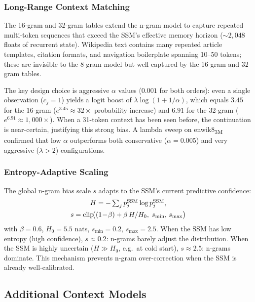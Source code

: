 \documentclass[10pt,twocolumn]{article}
\begin{document}
\subsubsection{Long-Range Context Matching}
\label{sec:longrange}

The 16-gram and 32-gram tables extend the n-gram model to capture
repeated multi-token sequences that exceed the SSM's effective memory
horizon (${\sim}2{,}048$ floats of recurrent state).  Wikipedia text
contains many repeated article templates, citation formats, and
navigation boilerplate spanning 10--50 tokens; these are invisible to
the 8-gram model but well-captured by the 16-gram and 32-gram
tables.

The key design choice is aggressive $\alpha$ values ($0.001$ for both
orders): even a single observation ($c_j=1$) yields a logit boost of
$\lambda\log(1+1/\alpha)$, which equals $3.45$ for the 16-gram
($e^{3.45}\approx 32\times$ probability increase) and $6.91$ for the
32-gram ($e^{6.91}\approx 1{,}000\times$).  When a 31-token context
has been seen before, the continuation is near-certain, justifying
this strong bias.  A lambda sweep on enwik8\textsubscript{3M}
confirmed that low $\alpha$ outperforms both conservative
($\alpha=0.005$) and very aggressive ($\lambda>2$) configurations.

\subsubsection{Entropy-Adaptive Scaling}
\label{sec:adaptive}

The global n-gram bias scale $s$ adapts to the SSM's current
predictive confidence:
\begin{gather}
  H = -\textstyle\sum_j p^\mathrm{SSM}_j \log p^\mathrm{SSM}_j,\notag\\
  s = \mathrm{clip}\!\bigl((1\!-\!\beta) + \beta\,H/H_0,\;
    s_\text{min},\, s_\text{max}\bigr)
  \label{eq:adaptscale}
\end{gather}
with $\beta=0.6$, $H_0=5.5$ nats, $s_\text{min}=0.2$,
$s_\text{max}=2.5$.  When the SSM has low entropy (high confidence),
$s\approx 0.2$: n-grams barely adjust the distribution.
When the SSM is highly uncertain ($H\gg H_0$, e.g.\ at cold start),
$s\approx 2.5$: n-grams dominate.
This mechanism prevents n-gram over-correction when the SSM is
already well-calibrated.

\subsection{Additional Context Models}
\label{sec:aux}
\end{document}
